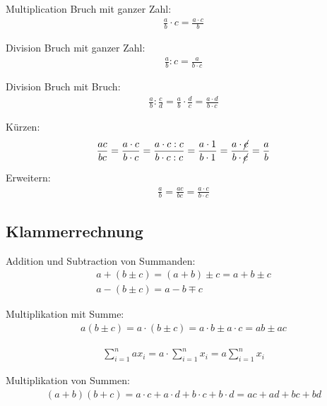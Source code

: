\documentclass[12pt,a4paper,fleqn,twoside,pdf,final]{article}
\begin{document}
Multiplication Bruch mit ganzer Zahl:
\begin{align*}
\frac{a}{b} \cdot c = \frac{a \cdot c}{b} 
\end{align*}

Division Bruch mit ganzer Zahl:
\begin{align*}
\frac{a}{b} : c = \frac{a}{b \cdot c} 
\end{align*}

Division Bruch mit Bruch:
\begin{align*}
\frac{a}{b} : \frac{c}{d} = \frac{a}{b}  \cdot \frac{d}{c} = \frac{a \cdot d }{b \cdot c} 
\end{align*}


\newcommand{\stkout}[1]{\ifmmode\text{\cancel{\ensuremath{#1}}}\else\sout{#1}\fi}


Kürzen:
\begin{align*}
\frac{ac}{bc} = \frac{a \cdot c}{b \cdot c} =  \frac{a \cdot c : c }{b \cdot c : c} =  \frac{a \cdot 1 }{b \cdot 1 } =  \frac{a \cdot \stkout{c} }{b \cdot \stkout{c}}  =  \frac{a}{b}  
\end{align*}

Erweitern:
\begin{align*}
\frac{a}{b} =  \frac{ac}{bc} =   \frac{a \cdot c}{b \cdot c} 
\end{align*}

\subsection{Klammerrechnung}

Addition und Subtraction von Summanden:
\begin{align*}
 a + (b \pm c) = (a + b) \pm c = a + b \pm c \\
 a - (b \pm c) =  a - b \mp c
\end{align*}




Multiplikation mit Summe:
\begin{align*}
 a (b \pm c) =  a \cdot (b \pm c) = a \cdot b \pm a \cdot c = ab \pm ac
\end{align*}

\begin{align*} 
 \sum_{i=1}^n ax_{i}  = a \cdot  \sum_{i=1}^n x_{i} = a  \sum_{i=1}^n x_{i}
 \end{align*}


Multiplikation von Summen:
\begin{align*}
 (a+b)(b+c) = a \cdot c +a \cdot d +b \cdot c +b \cdot d = ac +ad +bc +bd 
\end{align*}
\end{document}
